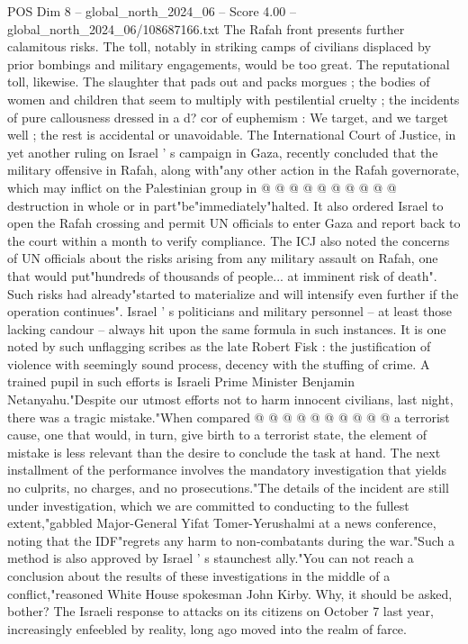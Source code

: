\begin{textsample}{POS Dim 8 – global\_north\_2024\_06 – Score 4.00 – global\_north\_2024\_06/108687166.txt}
The Rafah front presents further calamitous risks.
The toll, notably in striking camps of civilians displaced by prior bombings and military engagements, would be too great.
The reputational toll, likewise.
The slaughter that pads out and packs morgues ; the bodies of women and children that seem to multiply with pestilential cruelty ; the incidents of pure callousness dressed in a d? cor of euphemism : We target, and we target well ; the rest is accidental or unavoidable.
The International Court of Justice, in yet another ruling on Israel ' s campaign in Gaza, recently concluded that the military offensive in Rafah, along with"any other action in the Rafah governorate, which may inflict on the Palestinian group in @ @ @ @ @ @ @ @ @ @ destruction in whole or in part"be"immediately"halted.
It also ordered Israel to open the Rafah crossing and permit UN officials to enter Gaza and report back to the court within a month to verify compliance.
The ICJ also noted the concerns of UN officials about the risks arising from any military assault on Rafah, one that would put"hundreds of thousands of people... at imminent risk of death".
Such risks had already"started to materialize and will intensify even further if the operation continues".
Israel ' s politicians and military personnel -- at least those lacking candour -- always hit upon the same formula in such instances.
It is one noted by such unflagging scribes as the late Robert Fisk : the justification of violence with seemingly sound process, decency with the stuffing of crime.
A trained pupil in such efforts is Israeli Prime Minister Benjamin Netanyahu."Despite our utmost efforts not to harm innocent civilians, last night, there was a tragic mistake."When compared @ @ @ @ @ @ @ @ @ @ a terrorist cause, one that would, in turn, give birth to a terrorist state, the element of mistake is less relevant than the desire to conclude the task at hand.
The next installment of the performance involves the mandatory investigation that yields no culprits, no charges, and no prosecutions."The details of the incident are still under investigation, which we are committed to conducting to the fullest extent,"gabbled Major-General Yifat Tomer-Yerushalmi at a news conference, noting that the IDF"regrets any harm to non-combatants during the war."Such a method is also approved by Israel ' s staunchest ally."You can not reach a conclusion about the results of these investigations in the middle of a conflict,"reasoned White House spokesman John Kirby.
Why, it should be asked, bother?
The Israeli response to attacks on its citizens on October 7 last year, increasingly enfeebled by reality, long ago moved into the realm of farce.

\end{textsample}
